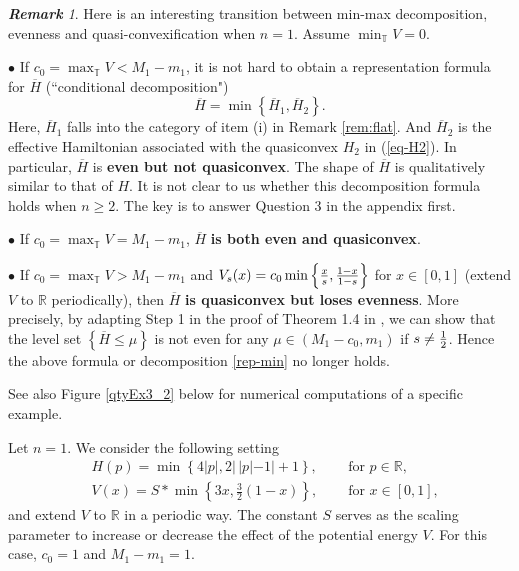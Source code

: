\documentclass[12pt,reqno]{amsart}
\theoremstyle{plain}
\theoremstyle{remark}
\newtheorem{rem}{\bf{Remark}}
\numberwithin{equation}{section}
\newcommand{\R}{\mathbb{R}}
\newcommand{\T}{\mathbb{T}}
\newcommand{\ol}{\overline}
\begin{document}
\begin{rem}\label{rem:conj}  Here is an interesting transition between min-max decomposition,  evenness and quasi-convexification when $n=1$. Assume $\min_{\T} V =0$.  

$\bullet$ If  $c_0=\max_{\T} V< M_1-m_1$,  it is not hard to  obtain a representation formula for $\ol{H}$ (``conditional decomposition")
\begin{equation}\label{rep-min}
\ol{H} = \min \left\{\ol{H}_1, \ol{H}_2 \right\}.
\end{equation}
Here, $\ol{H}_1$ falls into the category of item (i) in Remark \ref{rem:flat}.
And $\ol H_2$ is the effective Hamiltonian associated with the quasiconvex $H_2$ in (\ref{eq-H2}).  In particular,  $\ol H$ is {\bf even but not quasiconvex}.   The shape of $\ol H$ is qualitatively similar to that of $H$.  It is not clear to us whether this decomposition formula holds when $n\geq 2$.  The key is to answer Question 3 in the appendix first.  

\smallskip

$\bullet$  If $c_0=\max_{\T} V=M_1-m_1$,  $\ol H$ {\bf is both even and quasiconvex}. 

\smallskip


$\bullet$ If $c_0=\max_{\T} V>M_1-m_1$ and $V_s(x)=c_0\min\left\{{x\over s},  {1-x\over 1-s}\right\}$  for $x\in  [0,1]$ (extend $V$ to $\R$ periodically),  
then $\ol H$ {\bf is quasiconvex but  loses evenness}.  More precisely,  by adapting Step 1 in the proof of Theorem 1.4 in \cite{LTY},  we can show that the level set $\left\{\ol H\leq \mu\right\}$ is not even for any $\mu\in  (M_1-c_0, m_1)$ if $s\not={1\over 2}$. Hence the above  formula or decomposition \eqref{rep-min} no longer holds.

See also  Figure  \ref{qtyEx3_2} below for numerical computations of a specific example.  
\end{rem}


  Let $n=1$. We consider the following setting
\begin{align*}
&H(p) = \min\left\{4 |p|, 2|\, |p|-1|+1\right\}, \quad &\text{ for } p \in \R,\\
&V(x)= S*\min\left\{3 x, \frac{3}{2}(1-x)\right\}, \quad &\text{ for } x \in [0,1],
\end{align*}
and extend $V$ to $\R$ in a periodic way. 
The constant $S$ serves as the scaling parameter to increase or decrease the effect of the potential energy $V$.  
For this case, $c_0=1$ and $M_1-m_1=1$.  
\end{document}
